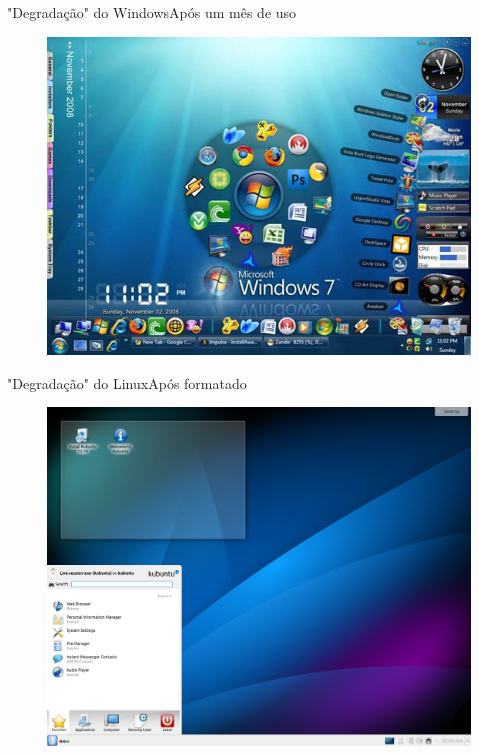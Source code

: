 \documentclass{beamer}
\begin{document}
\begin{frame}{"Degradação" do Windows}{Após um mês de uso}
    \begin{figure}[h!]
        \centering
        \includegraphics[scale=0.4]{ruindows7.jpg}
    \end{figure}
\end{frame}

\begin{frame}{"Degradação" do Linux}{Após formatado}
    \begin{figure}[h!]
        \centering
        \includegraphics[scale=0.25]{Kubuntu.png}
    \end{figure}
\end{frame}
\end{document}
